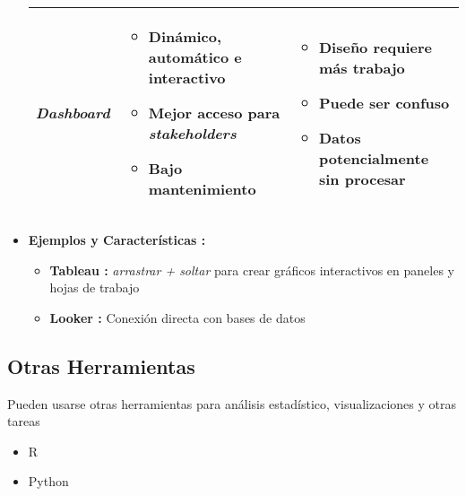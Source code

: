 \begin{itemize}
{\begin{itemize}
\begin{table}
\begin{tabular}{|p{2cm}|p{6cm}|p{6cm}|}
            \small{\textbf{\textit{Dashboard}}} & \begin{itemize}
                \item {Dinámico, automático e interactivo}
                \item {Mejor acceso para \textit{stakeholders}}
                \item {Bajo mantenimiento}
            \end{itemize} & \begin{itemize}
                \item {Diseño requiere más trabajo}
                \item {Puede ser confuso}
                \item {Datos potencialmente sin procesar}
            \end{itemize} \\
            \hline
        \end{tabular}
    \end{table}
    \end{itemize}}
    \item {\textbf{Ejemplos y Características : }
    \begin{itemize}
        \item {\textbf{Tableau : }\textit{arrastrar + soltar} para crear gráficos interactivos en paneles y hojas de trabajo}
        \item {\textbf{Looker : }Conexión directa con bases de datos}
    \end{itemize}}
\end{itemize}

\subsection{Otras Herramientas}
Pueden usarse otras herramientas para análisis estadístico, visualizaciones y otras tareas
\begin{itemize}
    \item {R}
    \item {Python}
\end{itemize}

\newpage